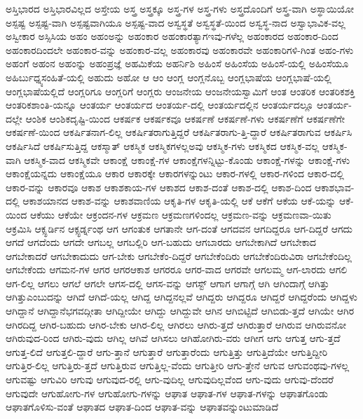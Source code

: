 {ಅಸ್ತಿಭಾರದ
ಅಸ್ತಿಭಾರವಿಲ್ಲದ
ಅಸ್ತೇಯ
ಅಸ್ತ್ರ
ಅಸ್ತ್ರಕ್ಕೂ
ಅಸ್ತ್ರ-ಗಳ
ಅಸ್ತ್ರ-ಗಳು
ಅಸ್ತ್ರದೊಂದಿಗೆ
ಅಸ್ತ್ರ-ವಾಗಿ
ಅಸ್ಥಾಯಿಯೋ
ಅಸ್ಪಷ್ಟ
ಅಸ್ಪಷ್ಟ-ವಾಗಿ
ಅಸ್ಪಷ್ಟವಾಗಿಯೂ
ಅಸ್ಪಷ್ಟ-ವಾದ
ಅಸ್ವಸ್ಥತೆ
ಅಸ್ವಸ್ಥತೆ-ಯಿಂದ
ಅಸ್ವಸ್ಥ-ನಾದ
ಅಸ್ವಾಭಾವಿಕ-ವಲ್ಲ
ಅಸ್ವೀಕಾರ
ಅಸ್ಸಿಸಿಯ
ಅಹಂ
ಅಹಂಅನ್ನು
ಅಹಂಕಾರ
ಅಹಂಕಾರತ್ಯಾಗಇವು-ಗಳೆಲ್ಲ
ಅಹಂಕಾರದ
ಅಹಂಕಾರ-ದಿಂದ
ಅಹಂಕಾರದಿಂದಲೇ
ಅಹಂಕಾರ-ವನ್ನು
ಅಹಂಕಾರ-ವಲ್ಲ
ಅಹಂಕಾರವು
ಅಹಂಕಾರವೇ
ಅಹಂಕಾರಿಗಳಿ-ಗಿಂತ
ಅಹಂ-ಗಳು
ಅಹಂಗೆ
ಅಹಂನ
ಅಹಂನ್ನು
ಅಹಂಪ್ರಜ್ಞೆ
ಅಹಮಿಕೆಯ
ಅಹರ್ನಿಶಿ
ಅಹಿಂಸೆ
ಅಹಿಂಸೆಯ
ಅಹಿಂಸೆ-ಯಲ್ಲಿ
ಅಹಿಂಸೆಯೂ
ಅಹಿರ್ಬುಧ್ನ್ಯಸಂಹಿತೆ-ಯಲ್ಲಿ
ಅಹುದು
ಅಹೋ
ಆ
ಆಂ
ಆಂಗ್ಲ
ಆಂಗ್ಲನೊಬ್ಬ
ಆಂಗ್ಲಭಾಷೆಯ
ಆಂಗ್ಲಭಾಷೆ-ಯಲ್ಲಿ
ಆಂಗ್ಲಭಾಷೆಯಲ್ಲಿದೆ
ಆಂಗ್ಲರಿಗೂ
ಆಂಗ್ಲರಿಗೆ
ಆಂಗ್ಲರು
ಆಂಜನೇಯ
ಆಂಜನೇಯಸ್ವಾಮಿಗೆ
ಆಂತ
ಆಂತರಿಕ
ಆಂತರಿಕಶಕ್ತಿ
ಆಂತರಿಕಶಾಂತಿ-ಯನ್ನೂ
ಆಂತರ್ಯ
ಆಂತರ್ಯದ
ಆಂತರ್ಯ-ದಲ್ಲಿ
ಆಂತರ್ಯದಲ್ಲಿನ
ಆಂತರ್ಯದಲ್ಲೂ
ಆಂತರ್ಯ-ದಲ್ಲೇ
ಆಂಶಿಕ
ಆಂಶಿಕದೃಷ್ಟಿ-ಯಿಂದ
ಆಕರ್ಷಕ
ಆಕರ್ಷಕವೂ
ಆಕರ್ಷಣೆ
ಆಕರ್ಷಣೆ-ಗಳು
ಆಕರ್ಷಣೆಗೆ
ಆಕರ್ಷಣೆಗೇ
ಆಕರ್ಷಣೆ-ಯಿಂದ
ಆಕರ್ಷಿತನಾಗ-ಲಿಲ್ಲ
ಆಕರ್ಷಿತರಾಗುತ್ತಿದ್ದರೆ
ಆಕರ್ಷಿತರಾಗು-ತ್ತಿ-ದ್ದಾರೆ
ಆಕರ್ಷಿತರಾಗುವ
ಆಕರ್ಷಿಸಿ
ಆಕರ್ಷಿಸಿದೆ
ಆಕರ್ಷಿಸುತ್ತಿದ್ದ
ಆಕಸ್ಮಾತ್
ಆಕಸ್ಮಿಕ
ಆಕಸ್ಮಿಕಗಳಲ್ಲಅವು
ಆಕಸ್ಮಿಕ-ಗಳು
ಆಕಸ್ಮಿಕದ
ಆಕಸ್ಮಿಕ-ವಲ್ಲ
ಆಕಸ್ಮಿಕ-ವಾಗಿ
ಆಕಸ್ಮಿಕ-ವಾದ
ಆಕಸ್ಮಿಕವೇ
ಆಕಾಂಕ್ಷೆ
ಆಕಾಂಕ್ಷೆ-ಗಳ
ಆಕಾಂಕ್ಷೆಗಳನ್ನಿಟ್ಟು-ಕೊಂಡು
ಆಕಾಂಕ್ಷೆ-ಗಳನ್ನು
ಆಕಾಂಕ್ಷೆ-ಗಳು
ಆಕಾಂಕ್ಷೆಯನ್ನದು
ಆಕಾಂಕ್ಷೆಯೂ
ಆಕಾರ
ಆಕಾರಕ್ಕೇ
ಆಕಾರಗಳನ್ನುಂಟು
ಆಕಾರ-ಗಳಲ್ಲಿ
ಆಕಾರ-ಗಳಿಂದ
ಆಕಾರ-ದಲ್ಲಿ
ಆಕಾರ-ವನ್ನು
ಆಕಾರವೂ
ಆಕಾಶ
ಆಕಾಶಕಾಯ-ಗಳ
ಆಕಾಶದ
ಆಕಾಶ-ದಂತೆ
ಆಕಾಶ-ದಲ್ಲಿ
ಆಕಾಶ-ದಿಂದ
ಆಕಾಶಭಾವ-ದಲ್ಲಿ
ಆಕಾಶಯಾನದ
ಆಕಾಶ-ವನ್ನು
ಆಕಾಶವಾಣಿಯ
ಆಕೃತಿ-ಗಳ
ಆಕೃತಿ-ಯಲ್ಲಿ
ಆಕೆ
ಆಕೆಗೆ
ಆಕೆಯ
ಆಕೆ-ಯನ್ನು
ಆಕೆ-ಯಿಂದ
ಆಕೆಯು
ಆಕೆಯೇ
ಆಕ್ರಂದನ-ಗಳ
ಆಕ್ರಮಣ
ಆಕ್ರಮಣಗಳಿಂದಲ್ಲ
ಆಕ್ರಮಣ-ವನ್ನು
ಆಕ್ರಮಣವಾ-ಯಿತು
ಆಕ್ರಮಿಸಿ
ಆಕ್ಸ್ಫರ್ಡಿನ
ಆಕ್ಸ್ಫರ್ಡ್ನಂಥ
ಆಗ
ಆಗಂತುಕ
ಆಗತಾನೇ
ಆಗ-ದಂತೆ
ಆಗದವನ
ಆಗದಿದ್ದರೂ
ಆಗ-ದಿದ್ದರೆ
ಆಗದು
ಆಗದೆ
ಆಗದೆಂದು
ಆಗದೇ
ಆಗಬಲ್ಲ
ಆಗಬಲ್ಲಿರಿ
ಆಗ-ಬಹುದು
ಆಗಬಾರದು
ಆಗಬೇಕಾಗಿದೆ
ಆಗಬೇಕಾದ
ಆಗಬೇಕಾದರೆ
ಆಗಬೇಕಾದುದು
ಆಗ-ಬೇಕು
ಆಗಬೇಕೆಂ-ದಿದ್ದರೆ
ಆಗಬೇಕೆಂದಿರು
ಆಗಬೇಕೆಂದಿರುವಿರಾ
ಆಗಬೇಕೆಂದಿಲ್ಲ
ಆಗಬೇಕೆಂದು
ಆಗಮನ-ಗಳ
ಆಗರ
ಆಗರಆಕಾಶ
ಆಗರರೂ
ಆಗರ-ವಾದ
ಆಗರವೇ
ಆಗಲಮ್ಮ
ಆಗ-ಲಾರದು
ಆಗಲಿ
ಆಗ-ಲಿಲ್ಲ
ಆಗಲು
ಆಗಲೆ
ಆಗಲೇ
ಆಗಸ-ದಲ್ಲಿ
ಆಗಸ-ವನ್ನು
ಆಗಸ್ಟ್
ಆಗಾಗ
ಆಗಾಗ್ಗೆ
ಆಗಿ
ಆಗಿಂದಾಗ್ಗೆ
ಆಗಿತ್ತು
ಆಗಿತ್ತುಎಂಬುದನ್ನು
ಆಗಿದೆ
ಆಗಿದೆ-ಯಲ್ಲ
ಆಗಿದ್ದ
ಆಗಿದ್ದನಲ್ಲವೆ
ಆಗಿದ್ದರು
ಆಗಿದ್ದರೂ
ಆಗಿದ್ದರೆ
ಆಗಿದ್ದರೆಂದು
ಆಗಿದ್ದಳು
ಆಗಿದ್ದಾನೆ
ಆಗಿದ್ದಾನೆಭಗವದ್ಗೀತಾ
ಆಗಿದ್ದೀಯೇ
ಆಗಿದ್ದು
ಆಗಿದ್ದುವೇ
ಆಗಿನ
ಆಗಿಬಿಟ್ಟಿದೆ
ಆಗಿಬಿಡು-ತ್ತದೆ
ಆಗಿಯೇ
ಆಗಿರ
ಆಗಿರದಿದ್ದ
ಆಗಿರ-ಬಹುದು
ಆಗಿರ-ಬೇಕು
ಆಗಿರ-ಲಿಲ್ಲ
ಆಗಿರಲು
ಆಗಿರು-ತ್ತದೆ
ಆಗಿರುತ್ತಾರೆ
ಆಗಿರುವ
ಆಗಿರುವನೋ
ಆಗಿರುವುದ-ರಿಂದ
ಆಗಿರು-ವುದು
ಆಗಿಲ್ಲ
ಆಗಿವೆ
ಆಗಿಸಲು
ಆಗಿಹೋಗಿರು-ವರು
ಆಗೀಗ
ಆಗು
ಆಗುತ್ತ
ಆಗು-ತ್ತದೆ
ಆಗುತ್ತ-ಲಿದೆ
ಆಗುತ್ತಲಿ-ದ್ದಾರೆ
ಆಗು-ತ್ತಾನೆ
ಆಗುತ್ತಾರೆ
ಆಗುತ್ತಾರೆಂದು
ಆಗುತ್ತಿತ್ತು
ಆಗುತ್ತಿದೆಯೇ
ಆಗುತ್ತಿದ್ದೀರಿ
ಆಗುತ್ತಿರ-ಲಿಲ್ಲ
ಆಗುತ್ತಿರು-ತ್ತದೆ
ಆಗುತ್ತಿರುವ
ಆಗುತ್ತಿಲ್ಲ-ವೆಂದು
ಆಗುತ್ತೀರಿ
ಆಗು-ತ್ತೇನೆ
ಆಗುವ
ಆಗುವಂಥವು-ಗಳಲ್ಲ
ಆಗುವಷ್ಟು
ಆಗುವಿರಿ
ಆಗುವು
ಆಗುವುದ-ರಲ್ಲಿ
ಆಗು-ವುದಿಲ್ಲ
ಆಗುವುದಿಲ್ಲವೆಂದ
ಆಗು-ವುದು
ಆಗುವು-ದೆಂದರೆ
ಆಗುವುದೇ
ಆಗುಹೋಗು-ಗಳ
ಆಗುಹೋಗು-ಗಳನ್ನು
ಆಘಾತ
ಆಘಾತ-ಗಳ
ಆಘಾತ-ಗಳನ್ನು
ಆಘಾತಗೊಂಡು
ಆಘಾತಗೊಳಿಸು-ವಂತೆ
ಆಘಾತದ
ಆಘಾತ-ದಿಂದ
ಆಘಾತ-ವನ್ನು
ಆಘಾತವನ್ನುಂಟುಮಾಡಿದೆ
}
